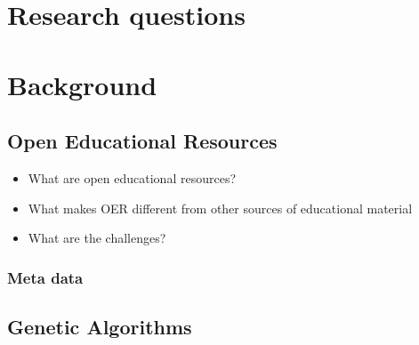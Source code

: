 \section{Research questions}
\section{Background}
\subsection{Open Educational Resources}
\begin{itemize}
	\item What are open educational resources?
	\item What makes OER different from other sources of educational material
	\item What are the challenges?
\end{itemize}
\subsubsection{Meta data}

\subsection{Genetic Algorithms}
